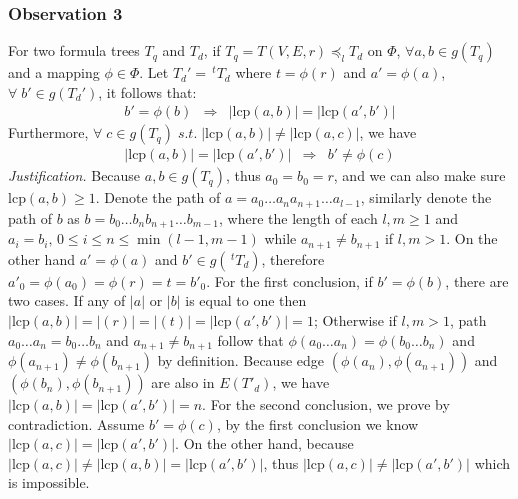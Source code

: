 \documentclass{acm_proc_article-sp}
\begin{document}
\subsubsection{Observation 3} 
\label{observation3}
For two formula trees $T_q$ and $T_d$, if $T_q = T(V,E,r) \preceq_l T_d$ on $\Phi$,  
$\forall a,b \in g(T_q)$ and a mapping $\phi \in \Phi$. 
Let $T_d' = \, ^{t}T_d$ where $t = \phi(r)$ and $a' = \phi(a)$, $\forall\; b' \in g(T_d')$, it follows that:
$$
\begin{array}{lcr}
b' = \phi(b)  & \Rightarrow & 
\left| \mathrm{lcp}(a,b) \right| = \left| \mathrm{lcp}(a',b') \right|
\end{array}
$$
Furthermore, $\forall\; c \in g(T_q)\; s.t.\; \left| \mathrm{lcp}(a,b) \right| \neq \left| \mathrm{lcp}(a,c) \right| $, we have
$$
\begin{array}{lcr}
\left| \mathrm{lcp}(a,b) \right| = \left| \mathrm{lcp}(a',b') \right|
& \Rightarrow &
b' \neq \phi(c)
\end{array} 
$$
\textit{Justification.} 
Because $a,b \in g(T_q)$, thus $a_0 = b_0 = r$, and we can also make sure $\mathrm{lcp}(a,b) \ge 1$. 
Denote the path of $a = a_0 \ldots a_n a_{n+1} \ldots a_{l-1}$, similarly denote the path of $b$ as $b=b_0 \ldots b_n b_{n+1} \ldots b_{m-1}$,
where the length of each $l,m \ge 1$ and $a_i = b_i,\, 0 \le i \le n \le \min(l-1, m-1)$ while $a_{n+1} \neq b_{n+1}$ if $l,m > 1$.
On the other hand $a' = \phi(a)$ and $b' \in g(\,^{t}T_d)$, therefore $a'_0 = \phi(a_0) = \phi(r) = t = b'_0$.
For the first conclusion, if $b' = \phi(b)$, there are two cases. If any of $|a|$ or $|b|$ is equal to one then $\left| \mathrm{lcp}(a,b) \right| = |(r)| = |(t)| = \left| \mathrm{lcp}(a',b') \right| = 1$;
Otherwise if $l,m > 1$, path $a_0 \ldots a_n = b_0 \ldots b_n$ and $a_{n+1} \neq b_{n+1}$ follow that $\phi(a_0 \ldots a_n) = \phi(b_0 \ldots b_n)$ and $\phi(a_{n+1}) \neq \phi(b_{n+1})$ by definition.
Because edge $(\phi(a_n), \phi(a_{n+1}))$ and $(\phi(b_n), \phi(b_{n+1}))$ are also in $E(T'_d)$, 
we have $\left| \mathrm{lcp}(a,b) \right| = \left| \mathrm{lcp}(a',b') \right| = n$.
For the second conclusion, we prove by contradiction. 
Assume $b' = \phi(c)$, by the first conclusion we know $\left| \mathrm{lcp}(a,c) \right| = \left| \mathrm{lcp}(a',b') \right|$.
On the other hand, because $\left| \mathrm{lcp}(a,c) \right| \neq \left| \mathrm{lcp}(a,b) \right| =  \left| \mathrm{lcp}(a',b') \right|$, 
thus $\left| \mathrm{lcp}(a,c) \right| \neq \left| \mathrm{lcp}(a',b') \right|$ which is impossible. 
\end{document}
